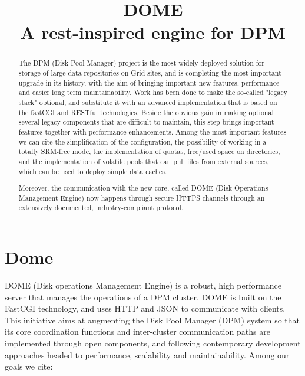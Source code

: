 \documentclass[a4paper,10pt]{scrreprt}
\title{DOME\\A rest-inspired engine for DPM}
\author{}
\begin{document}
\maketitle

\begin{abstract}


The DPM (Disk Pool Manager) project is the most widely deployed solution for storage of large
data repositories on Grid sites, and is completing the most important upgrade in its history,
with the aim of bringing important new features, performance and easier long term maintainability.
Work has been done to make the so-called "legacy stack" optional, and substitute it with
an advanced implementation that is based on the fastCGI and RESTful technologies.
Beside the obvious gain in making optional several legacy components that are difficult
to maintain, this step brings important features together with performance enhancements.
Among the most important features we can cite the simplification of the configuration,
the possibility of working in a totally SRM-free mode, the implementation of quotas,
free/used space on directories, and the implementation of volatile pools that
can pull files from external sources, which can be used to deploy simple data caches.

Moreover, the communication with the new core, called DOME (Disk Operations Management Engine)
now happens through secure HTTPS channels through an extensively documented,
industry-compliant protocol.

\end{abstract}



\newpage %



\tableofcontents %

\newpage %



\chapter{Dome}

DOME (Disk operations Management Engine) is a robust, high performance server that manages the operations of a DPM cluster. DOME is built on the FastCGI technology,
and uses HTTP and JSON to communicate with clients.
This initiative aims at augmenting the Disk Pool Manager (DPM) system so that its core coordination functions and inter-cluster communication paths are
implemented through open components, and following contemporary development approaches headed to performance, scalability and maintainability. Among our goals we cite:
\end{document}
